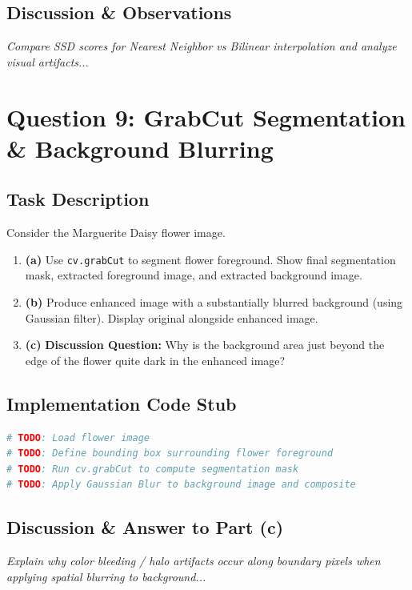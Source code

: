 \documentclass[12pt,a4paper]{article}
\begin{document}
\subsection{Discussion \& Observations}
\textit{Compare SSD scores for Nearest Neighbor vs Bilinear interpolation and analyze visual artifacts...}

\newpage

\section{Question 9: GrabCut Segmentation \& Background Blurring}

\subsection{Task Description}
Consider the Marguerite Daisy flower image.
\begin{enumerate}
    \item \textbf{(a)} Use \texttt{cv.grabCut} to segment flower foreground. Show final segmentation mask, extracted foreground image, and extracted background image.
    \item \textbf{(b)} Produce enhanced image with a substantially blurred background (using Gaussian filter). Display original alongside enhanced image.
    \item \textbf{(c)} \textbf{Discussion Question:} Why is the background area just beyond the edge of the flower quite dark in the enhanced image?
\end{enumerate}

\subsection{Implementation Code Stub}
\begin{lstlisting}[language=Python, caption={GrabCut Segmentation Code Stub}]
# TODO: Load flower image
# TODO: Define bounding box surrounding flower foreground
# TODO: Run cv.grabCut to compute segmentation mask
# TODO: Apply Gaussian Blur to background image and composite
\end{lstlisting}

\subsection{Discussion \& Answer to Part (c)}
\textit{Explain why color bleeding / halo artifacts occur along boundary pixels when applying spatial blurring to background...}
\end{document}
